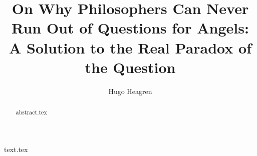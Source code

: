 \documentclass[12pt]{article}
\title{On Why Philosophers Can Never Run Out of Questions for Angels: A Solution to the Real Paradox of the Question}
\author{Hugo Heagren}
\date{}
\theoremstyle{mytheoremstyle} %
\begin{document}
 
\maketitle 
\begin{abstract}
\singlespacing
{abstract.tex}
\end{abstract}
{text.tex}
\printbibliography[]
\end{document}
